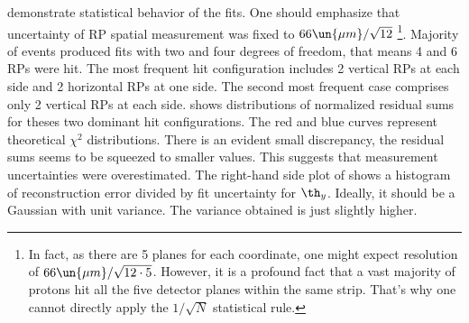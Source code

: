  demonstrate statistical behavior of the fits. One should emphasize that uncertainty of RP spatial measurement was fixed to $66\un{\mu m}/\sqrt{12}$ \footnote{
In fact, as there are 5 planes for each coordinate, one might expect resolution of $66\un{\mu m}/\sqrt{12\cdot 5}$. However, it is a profound fact that a vast majority of protons hit all the five detector planes within the same strip. That's why one cannot directly apply the $1/\sqrt{N}$ statistical rule.}.
Majority of events produced fits with two and four degrees of freedom, that means 4 and 6 RPs were hit. The most frequent hit configuration includes 2 vertical RPs at each side and 2 horizontal RPs at one side. The second most frequent case comprises only 2 vertical RPs at each side.  shows distributions of normalized residual sums for theses two dominant hit configurations. The red and blue curves represent theoretical $\chi^2$ distributions. There is an evident small discrepancy, the residual sums seems to be squeezed to smaller values. This suggests that measurement uncertainties were overestimated. The right-hand side plot of  shows a histogram of reconstruction error divided by fit uncertainty for $\th_y$. Ideally, it should be a Gaussian with unit variance. The variance obtained is just slightly higher.

\kern-8mm
\kern-8mm
\kern-8mm

